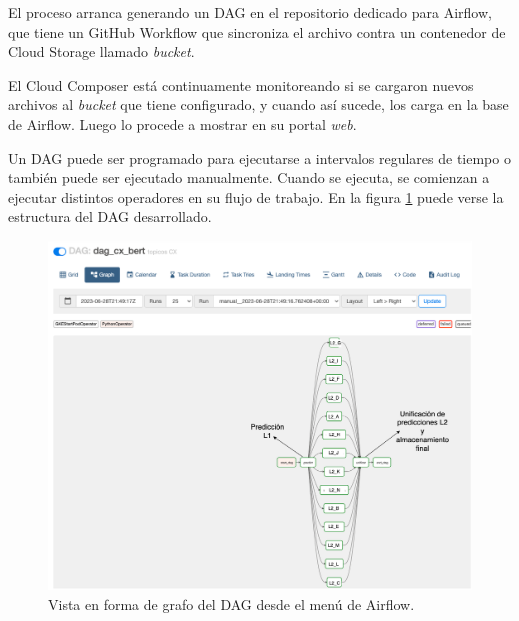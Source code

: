 El proceso arranca generando un DAG en el repositorio dedicado para Airflow, que tiene un GitHub Workflow que sincroniza el archivo contra un contenedor de Cloud Storage llamado \textit{bucket}. 

El Cloud Composer está continuamente monitoreando si se cargaron nuevos archivos al \textit{bucket} que tiene configurado, y cuando así sucede, los carga en la base de Airflow. Luego lo procede a mostrar en su portal \textit{web}.

Un DAG puede ser programado para ejecutarse a intervalos regulares de tiempo o también puede ser ejecutado manualmente. Cuando se ejecuta, se comienzan a ejecutar distintos operadores en su flujo de trabajo. En la figura \ref{fig:cap3-dag} puede verse la estructura del DAG desarrollado.

\begin{figure}[H]
	\centering
	\includegraphics[width=1\textwidth]{./Figures/cap3-dag.png}
	\caption{Vista en forma de grafo del DAG desde el menú de Airflow.}
	\label{fig:cap3-dag}
\end{figure}

